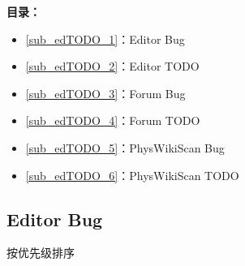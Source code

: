 
\textbf{目录：}
\begin{itemize}
\item \autoref{sub_edTODO_1}：Editor Bug
\item \autoref{sub_edTODO_2}：Editor TODO
\item \autoref{sub_edTODO_3}：Forum Bug
\item \autoref{sub_edTODO_4}：Forum TODO
\item \autoref{sub_edTODO_5}：PhysWikiScan Bug
\item \autoref{sub_edTODO_6}：PhysWikiScan TODO
\end{itemize}

\subsection{Editor Bug}\label{sub_edTODO_1}
按优先级排序
